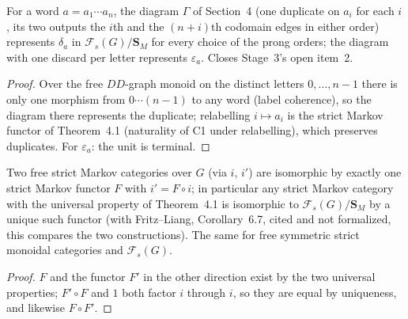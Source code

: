 \begin{theorem}
\label{s7:copy-diagram}
\leanok
{}
For a word $a = a_1 \cdots a_n$, the diagram $\Gamma$ of Section~4 (one duplicate on $a_i$ for
each $i$, its two outputs the $i$th and the $(n+i)$th codomain edges in either order) represents
$\delta_a$ in $\mathcal F_s(G)/\mathbf S_M$ for every choice of the prong orders; the diagram with
one discard per letter represents $\varepsilon_a$. Closes Stage~3's open item~2.
\end{theorem}
\begin{proof}
\leanok
Over the free $DD$-graph monoid on the distinct letters $0, \ldots, n-1$ there is only one
morphism from $0 \cdots (n-1)$ to any word (label coherence), so the diagram there represents the
duplicate; relabelling $i \mapsto a_i$ is the strict Markov functor of Theorem~4.1 (naturality of
C1 under relabelling), which preserves duplicates. For $\varepsilon_a$: the unit is terminal.
\end{proof}

\begin{theorem}
\label{s7:unique}
\leanok
{}
Two free strict Markov categories over $G$ (via $i$, $i'$) are isomorphic by exactly one strict
Markov functor $F$ with $i' = F \circ i$; in particular any strict Markov category with the
universal property of Theorem~4.1 is isomorphic to $\mathcal F_s(G)/\mathbf S_M$ by a unique such
functor (with Fritz--Liang, Corollary~6.7, cited and not formalized, this compares the two
constructions). The same for free symmetric strict monoidal categories and $\mathcal F_s(G)$.
\end{theorem}
\begin{proof}
\leanok
$F$ and the functor $F'$ in the other direction exist by the two universal properties;
$F' \circ F$ and $1$ both factor $i$ through $i$, so they are equal by uniqueness, and likewise
$F \circ F'$.
\end{proof}

